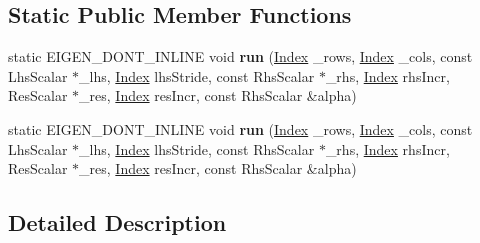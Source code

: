 \subsection*{Static Public Member Functions}
\begin{DoxyCompactItemize}
\item 
\mbox{\label{struct_eigen_1_1internal_1_1triangular__matrix__vector__product_3_01_index_00_01_mode_00_01_lhs_ba3c1ba3cb379196807b17d99fce4e08_a89cb957348fb21a7125fcb511a750df2}} 
static E\+I\+G\+E\+N\+\_\+\+D\+O\+N\+T\+\_\+\+I\+N\+L\+I\+NE void {\bfseries run} (\hyperlink{namespace_eigen_a62e77e0933482dafde8fe197d9a2cfde}{Index} \+\_\+rows, \hyperlink{namespace_eigen_a62e77e0933482dafde8fe197d9a2cfde}{Index} \+\_\+cols, const Lhs\+Scalar $\ast$\+\_\+lhs, \hyperlink{namespace_eigen_a62e77e0933482dafde8fe197d9a2cfde}{Index} lhs\+Stride, const Rhs\+Scalar $\ast$\+\_\+rhs, \hyperlink{namespace_eigen_a62e77e0933482dafde8fe197d9a2cfde}{Index} rhs\+Incr, Res\+Scalar $\ast$\+\_\+res, \hyperlink{namespace_eigen_a62e77e0933482dafde8fe197d9a2cfde}{Index} res\+Incr, const Rhs\+Scalar \&alpha)
\item 
\mbox{\label{struct_eigen_1_1internal_1_1triangular__matrix__vector__product_3_01_index_00_01_mode_00_01_lhs_ba3c1ba3cb379196807b17d99fce4e08_abe2d7c2e3824ad4a4c6ce5df447c84ef}} 
static E\+I\+G\+E\+N\+\_\+\+D\+O\+N\+T\+\_\+\+I\+N\+L\+I\+NE void {\bfseries run} (\hyperlink{namespace_eigen_a62e77e0933482dafde8fe197d9a2cfde}{Index} \+\_\+rows, \hyperlink{namespace_eigen_a62e77e0933482dafde8fe197d9a2cfde}{Index} \+\_\+cols, const Lhs\+Scalar $\ast$\+\_\+lhs, \hyperlink{namespace_eigen_a62e77e0933482dafde8fe197d9a2cfde}{Index} lhs\+Stride, const Rhs\+Scalar $\ast$\+\_\+rhs, \hyperlink{namespace_eigen_a62e77e0933482dafde8fe197d9a2cfde}{Index} rhs\+Incr, Res\+Scalar $\ast$\+\_\+res, \hyperlink{namespace_eigen_a62e77e0933482dafde8fe197d9a2cfde}{Index} res\+Incr, const Rhs\+Scalar \&alpha)
\end{DoxyCompactItemize}


\subsection{Detailed Description}
